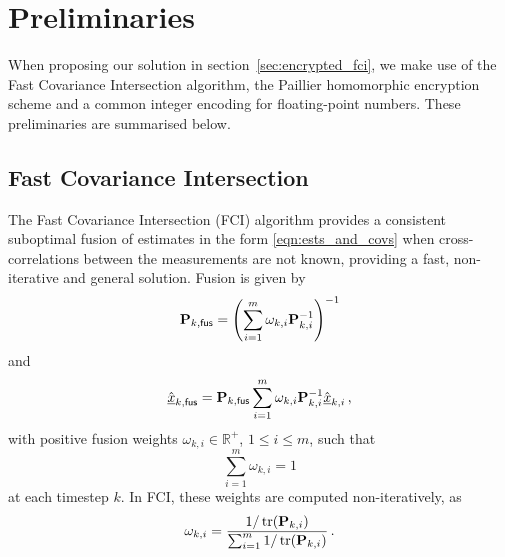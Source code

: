 \documentclass[letterpaper, 10 pt, conference]{ieeeconf}
\begin{document}
% 
%                                                                 
%                                                                 
%                                                                 
% 
\section{Preliminaries}\label{sec:prelims}
When proposing our solution in section~\ref{sec:encrypted_fci}, we make use of the Fast Covariance Intersection algorithm, the Paillier homomorphic encryption scheme and a common integer encoding for floating-point numbers. These preliminaries are summarised below.

\subsection{Fast Covariance Intersection}\label{subsec:fci}
The Fast Covariance Intersection (FCI) algorithm \cite{niehsenInformationFusionBased2002} provides a consistent suboptimal fusion of estimates in the form \eqref{eqn:ests_and_covs} when cross-correlations between the measurements are not known, providing a fast, non-iterative and general solution. Fusion is given by
\begin{equation}\label{eqn:ci_cov_fusion}
    {\ensuremath{{\mathbf{P}}}}_{k,\mathsf{fus}} = \left(\sum_{i=1}^m\omega_{k,i}{{\mathbf{P}}}_{k,i}^{-1}\right)^{-1}
\end{equation}
and
\begin{equation}\label{eqn:ci_est_fusion}
    \hat{{\underline{x}}}_{k,\mathsf{fus}} = {{\mathbf{P}}}_{k,\mathsf{fus}}\sum_{i=1}^m\omega_{k,i}{{\mathbf{P}}}_{k,i}^{-1}\hat{{\underline{x}}}_{k,i}\,,
\end{equation}
with positive fusion weights $\omega_{k,i} \in \mathbb{R}^{+}$, $1\leq i \leq m$, such that 
\begin{equation}
    \sum_{i=1}^m\omega_{k,i}=1
\end{equation}
at each timestep $k$. In FCI, these weights are computed non-iteratively, as
\begin{equation}\label{eqn:fci_weights}
    \omega_{k,i} = \frac{1/\operatorname{tr}({{\mathbf{P}}}_{k,i})}{\sum_{i=1}^m 1/\operatorname{tr}({{\mathbf{P}}}_{k,i})}\,.
\end{equation}
\end{document}
